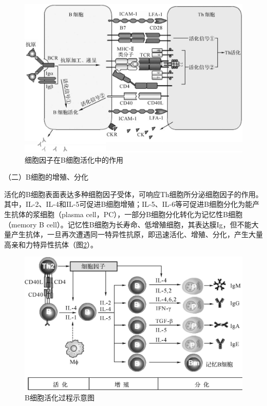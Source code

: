 \begin{figure}[!htbp]
 \centering
 \includegraphics{./images/Image00144.jpg}
 \captionsetup{justification=centering}
 \caption{细胞因子在B细胞活化中的作用}
 \label{fig9-18}
  \end{figure} 

（二）B细胞的增殖、分化

活化的B细胞表面表达多种细胞因子受体，可响应Th细胞所分泌细胞因子的作用。其中，IL-2、IL-4和IL-5可促进B细胞增殖；IL-5、IL-6等可促进B细胞分化为能产生抗体的浆细胞（plasma
cell，PC），一部分B细胞分化转化为记忆性B细胞（memory B
cell）。记忆性B细胞为长寿命、低增殖细胞，其表达膜Ig，但不能大量产生抗体，一旦再次遭遇同一特异性抗原，即迅速活化、增殖、分化，产生大量高亲和力特异性抗体（图\ref{fig9-19}）。

\begin{figure}[!htbp]
 \centering
 \includegraphics{./images/Image00145.jpg}
 \captionsetup{justification=centering}
 \caption{B细胞活化过程示意图}
 \label{fig9-19}
  \end{figure} 


